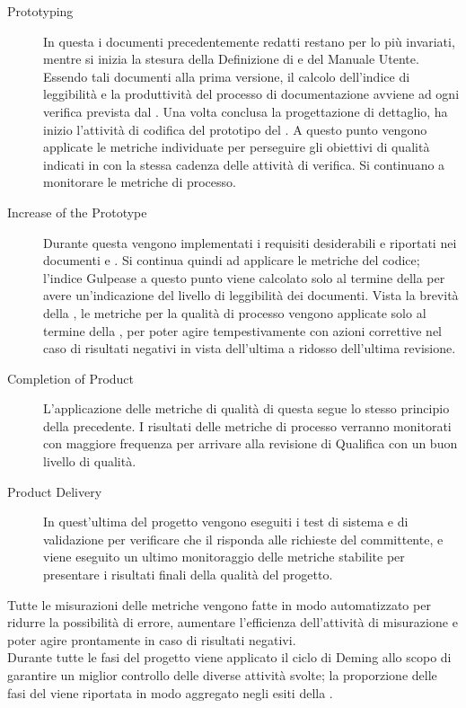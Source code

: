 \begin{description}
		\item[ Prototyping] In questa  i documenti precedentemente redatti restano per lo più invariati, mentre si inizia la stesura della Definizione di  e del Manuale Utente. Essendo tali documenti alla prima versione, il calcolo dell'indice di leggibilità e la produttività del processo di documentazione avviene ad ogni verifica prevista dal . Una volta conclusa la progettazione di dettaglio, ha inizio l'attività di codifica del prototipo del . A questo punto vengono applicate le metriche individuate per perseguire gli obiettivi di qualità indicati in  con la stessa cadenza delle attività di verifica. Si continuano a monitorare le metriche di processo.
		\item[ Increase of the Prototype] Durante questa  vengono implementati i requisiti desiderabili e riportati nei documenti  e . Si continua quindi ad applicare le metriche del codice; l'indice  Gulpease a questo punto viene calcolato solo al termine della  per avere un'indicazione del livello di leggibilità dei documenti. Vista la brevità della , le metriche per la qualità di processo vengono applicate solo al termine della , per poter agire tempestivamente con azioni correttive nel caso di risultati negativi in vista dell'ultima  a ridosso dell'ultima revisione.
		\item[ Completion of Product] L'applicazione delle metriche di qualità di questa  segue lo stesso principio della precedente. I risultati delle metriche di processo verranno monitorati con maggiore frequenza per arrivare alla revisione di Qualifica con un buon livello di qualità.
		\item[ Product Delivery] In quest'ultima  del progetto vengono eseguiti i test di sistema e di validazione per verificare che il  risponda alle richieste del committente, e viene eseguito un ultimo monitoraggio delle metriche stabilite per presentare i risultati finali della qualità del progetto.
		\end{description}
		Tutte le misurazioni delle metriche vengono fatte in modo automatizzato per ridurre la possibilità di errore, aumentare l'efficienza dell'attività di misurazione e poter agire prontamente in caso di risultati negativi.\\
		Durante tutte le fasi del progetto viene applicato il ciclo di Deming allo scopo di garantire un miglior controllo delle diverse attività svolte; la proporzione delle fasi del  viene riportata in modo aggregato negli esiti della .